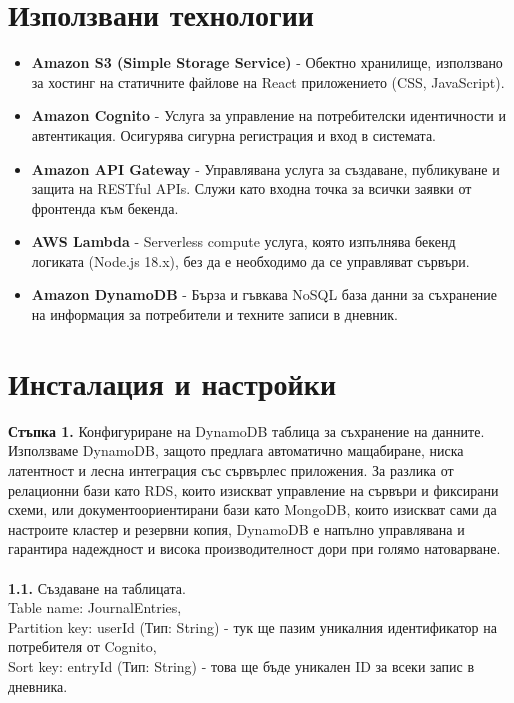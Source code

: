 \documentclass[12pt]{article}
\begin{document}

\section{Използвани технологии}
\begin{itemize}
\item \textbf{Amazon S3 (Simple Storage Service)} - Обектно хранилище, използвано за хостинг на статичните файлове на React приложението (CSS, JavaScript).\\

\item \textbf{Amazon Cognito} - Услуга за управление на потребителски идентичности и автентикация. Осигурява сигурна регистрация и вход в системата.\\

\item \textbf{Amazon API Gateway} - Управлявана услуга за създаване, публикуване и защита на RESTful APIs. Служи като входна точка за всички заявки от фронтенда към бекенда.\\

\item \textbf{AWS Lambda} - Serverless compute услуга, която изпълнява бекенд логиката (Node.js 18.x), без да е необходимо да се управляват сървъри.\\

\item \textbf{Amazon DynamoDB} - Бърза и гъвкава NoSQL база данни за съхранение на информация за потребители и техните записи в дневник.\\
\end{itemize}


\section{Инсталация и настройки}

\noindent\textbf{Стъпка 1.} Конфигуриране на DynamoDB таблица за съхранение на данните. Използваме DynamoDB, защото предлага автоматично мащабиране, ниска латентност и лесна интеграция със сървърлес приложения. За разлика от релационни бази като RDS, които изискват управление на сървъри и фиксирани схеми, или документоориентирани бази като MongoDB, които изискват сами да настроите кластер и резервни копия, DynamoDB е напълно управлявана и гарантира надеждност и висока производителност дори при голямо натоварване.
\\
\\
\noindent\textbf{1.1.} Създаване на таблицата.\\
Table name: JournalEntries,\\
Partition key: userId (Тип: String) - тук ще пазим уникалния идентификатор на потребителя от Cognito,\\
Sort key: entryId (Тип: String) - това ще бъде уникален ID за всеки запис в дневника.
\end{document}
